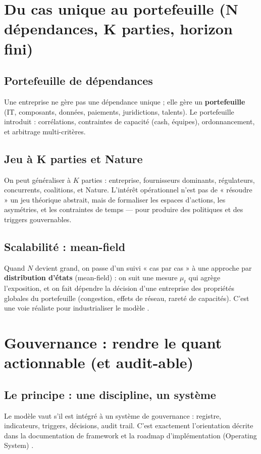 \documentclass[11pt,a4paper]{article}
\begin{document}
\section{Du cas unique au portefeuille (N dépendances, K parties, horizon fini)}

\subsection{Portefeuille de dépendances}
Une entreprise ne gère pas une dépendance unique ; elle gère un \textbf{portefeuille} (IT, composants, données, paiements, juridictions, talents). Le portefeuille introduit :
corrélations, contraintes de capacité (cash, équipes), ordonnancement, et arbitrage multi-critères.

\subsection{Jeu à K parties et Nature}
On peut généraliser à \(K\) parties : entreprise, fournisseurs dominants, régulateurs, concurrents, coalitions, et Nature.
L’intérêt opérationnel n’est pas de « résoudre » un jeu théorique abstrait, mais de formaliser les espaces d’actions, les asymétries, et les contraintes de temps — pour produire des politiques et des triggers gouvernables.

\subsection{Scalabilité : mean-field}
Quand \(N\) devient grand, on passe d’un suivi « cas par cas » à une approche par \textbf{distribution d’états} (mean-field) : on suit une mesure \(\mu_t\) qui agrège l’exposition, et on fait dépendre la décision d’une entreprise des propriétés globales du portefeuille (congestion, effets de réseau, rareté de capacités).
C’est une voie réaliste pour industrialiser le modèle \citep{carmonaDelarue2018}.

\section{Gouvernance : rendre le quant actionnable (et audit-able)}

\subsection{Le principe : une discipline, un système}
Le modèle vaut s’il est intégré à un système de gouvernance : registre, indicateurs, triggers, décisions, audit trail.
C’est exactement l’orientation décrite dans la documentation de framework et la roadmap d’implémentation (Operating System) \citep{internalFramework,internalRoadmap}.
\end{document}
